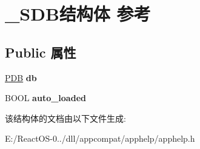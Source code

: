 \hypertarget{struct___s_d_b}{}\section{\+\_\+\+S\+D\+B结构体 参考}
\label{struct___s_d_b}
\subsection*{Public 属性}
\begin{DoxyCompactItemize}
\item 
\mbox{\label{struct___s_d_b_a8556876ba53f084f49a0df926561aa2e}} 
\hyperlink{struct___d_b}{P\+DB} {\bfseries db}
\item 
\mbox{\label{struct___s_d_b_a280b3583933467e9d3140bece0c62998}} 
B\+O\+OL {\bfseries auto\+\_\+loaded}
\end{DoxyCompactItemize}


该结构体的文档由以下文件生成\+:\begin{DoxyCompactItemize}
\item 
E\+:/\+React\+O\+S-\/0../dll/appcompat/apphelp/apphelp.\+h\end{DoxyCompactItemize}
